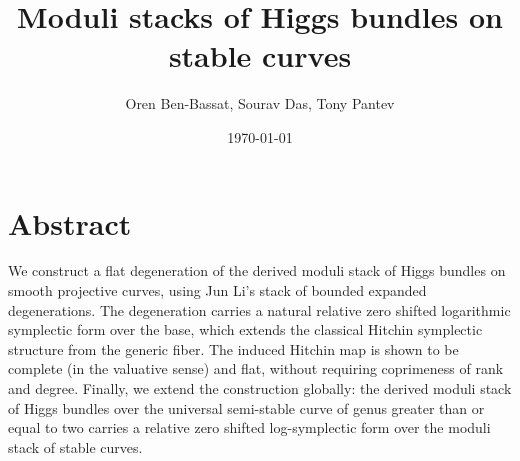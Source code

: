\documentclass[11pt]{amsart}
\theoremstyle{plain}
\numberwithin{equation}{section}
\theoremstyle{definition}
\theoremstyle{plain}
\begin{document}
\title{Moduli stacks of Higgs bundles on stable curves}
\author{Oren Ben-Bassat, Sourav Das, Tony Pantev}
\date{\today}

\setlength{\abovedisplayskip}{16pt}
\setlength{\belowdisplayskip}{10pt}
\maketitle

\section*{\textbf{Abstract}}
We construct a flat degeneration of the derived moduli stack of Higgs bundles on smooth projective curves, using Jun Li’s stack of bounded expanded degenerations. The degeneration carries a natural relative zero shifted logarithmic symplectic form over the base, which extends the classical Hitchin symplectic structure from the generic fiber. The induced Hitchin map is shown to be complete (in the valuative sense) and flat, without requiring coprimeness of rank and degree. Finally, we extend the construction globally: the derived moduli stack of Higgs bundles over the universal semi-stable curve of genus greater than or equal to two carries a relative zero shifted log-symplectic form over the moduli stack of stable curves.

\tableofcontents
\end{document}
